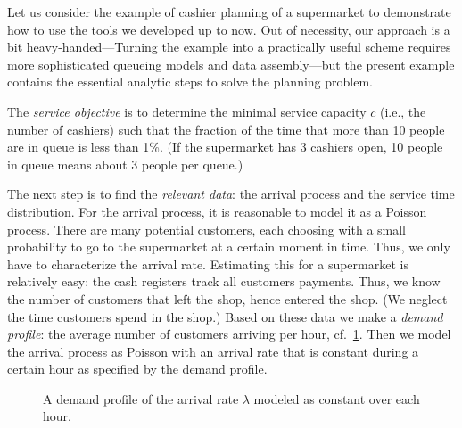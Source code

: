 Let us consider the example of cashier planning of a supermarket to
demonstrate how to use the tools we developed up to now. Out of
necessity, our approach is a bit heavy-handed---Turning the example
into a practically useful scheme requires more sophisticated queueing
models and data assembly---but the present example contains the
essential analytic steps to solve the planning problem.

The \emph{service objective} is to determine the minimal service
capacity $c$ (i.e., the number of cashiers) such that the fraction of the time that more than 
10 people are in queue is less than 1\%. (If the supermarket has 3 cashiers open, 10 people in queue means about 3 people per queue.)

The next step is to find the \emph{relevant data}: the arrival process and the service time distribution. For the arrival process, it is reasonable to model it as a Poisson process. There are many potential customers, each choosing with a small probability to go to the supermarket at a certain moment in time. Thus, we only have to characterize the arrival rate. Estimating this for a supermarket is relatively easy: the cash registers track all customers
payments. Thus, we know the number of customers that left the shop,
hence entered the shop. (We neglect the time customers spend in the
shop.) Based on these data we make a \emph{demand profile}: the
average number of customers arriving per hour, cf.~\cref{fig:loadprofile}. Then we model the arrival process as Poisson with an arrival rate that is constant during a certain hour as specified by the demand profile. 

\begin{figure}[t]
 \centering
{}
 \caption{A demand profile of the arrival rate $\lambda$ modeled as constant over each hour.}
 \label{fig:loadprofile}
\end{figure}


